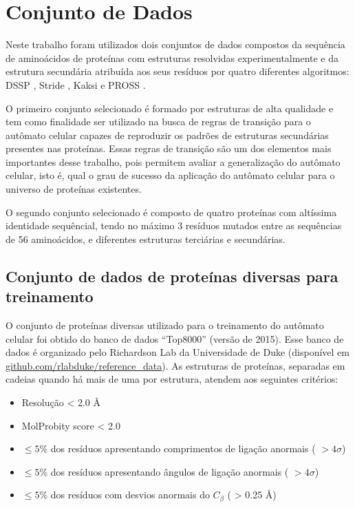 \chapter{Conjunto de Dados}

Neste trabalho foram utilizados dois conjuntos de dados compostos da sequência de aminoácidos de proteínas com estruturas resolvidas experimentalmente e da estrutura secundária atribuída aos seus resíduos por quatro diferentes algoritmos: DSSP \cite{Kabsch1983a}, Stride \cite{Frishman1995a}, Kaksi \cite{Martin2005b} e PROSS \cite{Srinivasan1999b}.

O primeiro conjunto selecionado é formado por  estruturas de alta qualidade e tem como finalidade ser utilizado na busca de regras de transição para o autômato celular capazes de reproduzir os padrões de estruturas secundárias presentes nas proteínas. Essas regras de transição são um dos elementos mais importantes desse trabalho, pois permitem avaliar a generalização do autômato celular, isto é, qual o grau de sucesso da aplicação do autômato celular para o universo de proteínas existentes.

O segundo conjunto selecionado é composto de quatro proteínas com altíssima identidade sequêncial, tendo no máximo 3 resíduos mutados entre as sequências de 56 aminoácidos, e diferentes estruturas terciárias e secundárias. 


\section{Conjunto de dados de proteínas diversas para treinamento}

O conjunto de proteínas diversas utilizado para o treinamento do autômato celular foi obtido do banco de dados “Top8000” (versão de 2015). Esse banco de dados é organizado pelo Richardson Lab da Universidade de Duke (disponível em \href{https://github.com/rlabduke/reference_data}{github.com/rlabduke/reference\_data}). As estruturas de proteínas, separadas em cadeias quando há mais de uma por estrutura, atendem aos seguintes critérios:

\begin{itemize}
	\item{Resolução < 2.0 \AA}
	\item{MolProbity score < 2.0}
	\item{$\le 5 \%$ dos resíduos apresentando comprimentos de ligação anormais ( $> 4\sigma$)}
	\item{$\le 5 \%$ dos resíduos apresentando ângulos de ligação anormais ( $> 4\sigma$)}
	\item{$\le 5 \%$ dos resíduos com desvios anormais do  $C_\beta$ ( > 0.25 \AA)}
\end{itemize}

